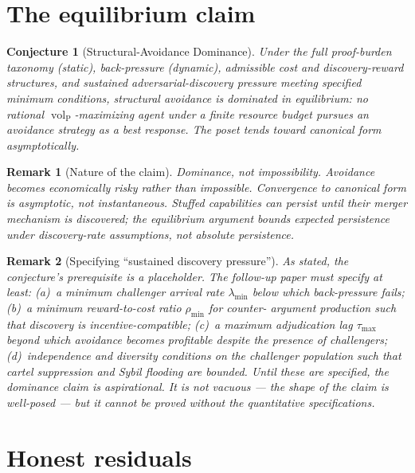 \documentclass{article}
\newtheorem{conjecture}{Conjecture}
\newtheorem{remark}{Remark}
\DeclareMathOperator{\vol}{vol}
\newcommand{\volL}{{\vol_{\mathrm{P}}}}
\begin{document}
\section{The equilibrium claim}

\begin{conjecture}[Structural-Avoidance Dominance]
\label{conj:avoidance_dominance}
Under the full proof-burden taxonomy (static), back-pressure
(dynamic), admissible cost and discovery-reward structures, and
sustained adversarial-discovery pressure meeting specified
minimum conditions, structural avoidance is dominated in
equilibrium: no rational $\volL$-maximizing agent under a finite
resource budget pursues an avoidance strategy as a best response.
The poset tends toward canonical form asymptotically.
\end{conjecture}

\begin{remark}[Nature of the claim]
Dominance, not impossibility.  Avoidance becomes economically
risky rather than impossible.  Convergence to canonical form is
asymptotic, not instantaneous.  Stuffed capabilities can persist
until their merger mechanism is discovered; the equilibrium
argument bounds expected persistence under discovery-rate
assumptions, not absolute persistence.
\end{remark}

\begin{remark}[Specifying ``sustained discovery pressure'']
\label{rem:discovery_pressure}
As stated, the conjecture's prerequisite is a placeholder.  The
follow-up paper must specify at least: (a)~a minimum challenger
arrival rate $\lambda_{\min}$ below which back-pressure fails;
(b)~a minimum reward-to-cost ratio $\rho_{\min}$ for counter-
argument production such that discovery is
incentive-compatible; (c)~a maximum adjudication lag
$\tau_{\max}$ beyond which avoidance becomes profitable despite
the presence of challengers; (d)~independence and diversity
conditions on the challenger population such that cartel
suppression and Sybil flooding are bounded.  Until these are
specified, the dominance claim is aspirational.  It is not
vacuous --- the shape of the claim is well-posed --- but it
cannot be proved without the quantitative specifications.
\end{remark}

\section{Honest residuals}
\end{document}
